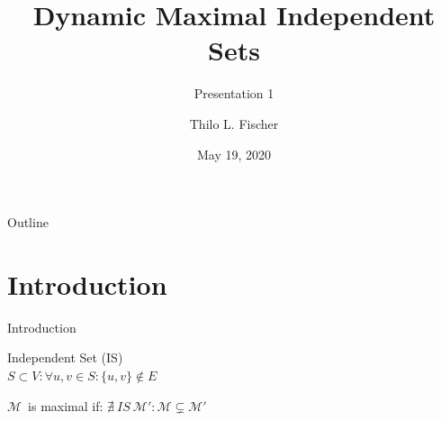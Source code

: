 \documentclass{beamer}
\title[ShortTitle]{Dynamic Maximal Independent Sets}
\subtitle{Presentation 1}
\author{Thilo L. Fischer}
\date{May 19, 2020}
\newcommand{\M}{$\mathcal{M}$}
\begin{document}
\begin{frame}
  \titlepage
\end{frame}

\begin{frame}{Outline}
  \tableofcontents
\end{frame}

\section{Introduction}
\begin{frame}{Introduction}

  \begin{definition}{Independent Set (IS)}
  \\
    $S \subset V: \forall u, v \in S: \{u, v\} \notin E$
  \end{definition}


  \begin{definition}
    \M\ is maximal if: $\nexists \  IS \ \mathcal{M'}: \mathcal{M} \subsetneq \mathcal{M'}$
  \end{definition}

\end{frame}
\end{document}
